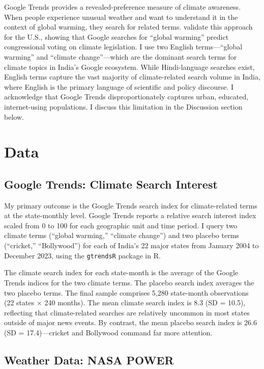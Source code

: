 \documentclass[12pt]{article}
\begin{document}
Google Trends provides a revealed-preference measure of climate awareness. When people experience unusual weather and want to understand it in the context of global warming, they search for related terms. \citet{herrnstadt2014} validate this approach for the U.S., showing that Google searches for ``global warming'' predict congressional voting on climate legislation. I use two English terms---``global warming'' and ``climate change''---which are the dominant search terms for climate topics in India's Google ecosystem. While Hindi-language searches exist, English terms capture the vast majority of climate-related search volume in India, where English is the primary language of scientific and policy discourse. I acknowledge that Google Trends disproportionately captures urban, educated, internet-using populations. I discuss this limitation in the Discussion section below.

\section{Data}

\subsection{Google Trends: Climate Search Interest}

My primary outcome is the Google Trends search index for climate-related terms at the state-monthly level. Google Trends reports a relative search interest index scaled from 0 to 100 for each geographic unit and time period. I query two climate terms (``global warming,'' ``climate change'') and two placebo terms (``cricket,'' ``Bollywood'') for each of India's 22 major states from January 2004 to December 2023, using the \texttt{gtrendsR} package in R.

The climate search index for each state-month is the average of the Google Trends indices for the two climate terms. The placebo search index averages the two placebo terms. The final sample comprises 5,280 state-month observations (22 states $\times$ 240 months). The mean climate search index is 8.3 (SD = 10.5), reflecting that climate-related searches are relatively uncommon in most states outside of major news events. By contrast, the mean placebo search index is 26.6 (SD = 17.4)---cricket and Bollywood command far more attention.

\subsection{Weather Data: NASA POWER}
\end{document}
